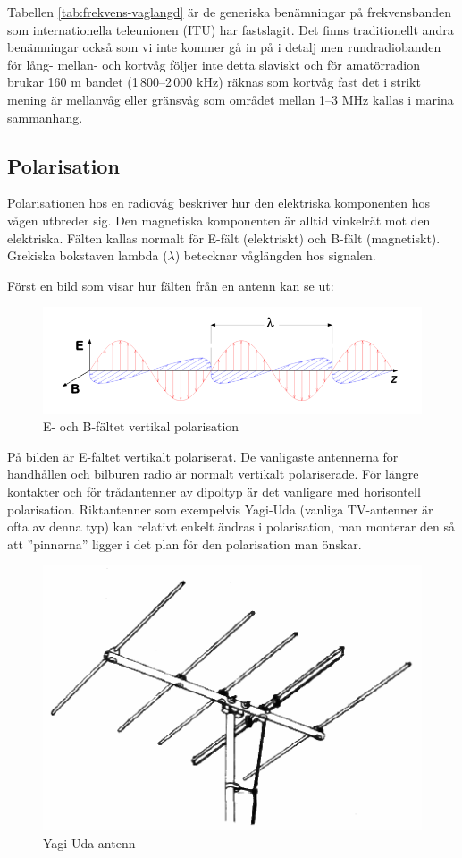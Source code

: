 Tabellen \ref{tab:frekvens-vaglangd} är de generiska benämningar på frekvensbanden som internationella teleunionen (ITU) har fastslagit. Det finns traditionellt andra benämningar också som vi inte kommer gå in på i detalj men rundradiobanden för lång- mellan- och kortvåg följer inte detta slaviskt och för amatörradion brukar 160 m bandet (1\,800--2\,000 kHz) räknas som kortvåg fast det i strikt mening är mellanvåg eller gränsvåg som området mellan 1--3 MHz kallas i marina sammanhang.

\subsection{Polarisation}

Polarisationen hos en radiovåg beskriver hur den elektriska komponenten hos vågen utbreder sig. Den magnetiska komponenten är alltid vinkelrät mot den elektriska. Fälten kallas normalt för E-fält (elektriskt) och B-fält (magnetiskt). Grekiska bokstaven lambda ($\lambda$) betecknar våglängden hos signalen.

Först en bild som visar hur fälten från en antenn kan se ut:

\begin{figure}[h]
	\centering\includegraphics[width=\textwidth]{img/em-wave}
	\caption{E- och B-fältet vertikal polarisation}
\end{figure}

På bilden är E-fältet vertikalt polariserat. De vanligaste antennerna för handhållen och bilburen radio är normalt vertikalt polariserade. För längre kontakter och för trådantenner av dipoltyp är det vanligare med horisontell polarisation. Riktantenner som exempelvis Yagi-Uda (vanliga TV-antenner är ofta av denna typ) kan relativt enkelt ändras i polarisation, man monterar den så att ''pinnarna'' ligger i det plan för den polarisation man önskar.

\begin{figure}[h]
	\centering
	\includegraphics[width=.4\textwidth]{img/yagi-uda}	
	\caption{Yagi-Uda antenn}
\end{figure}

